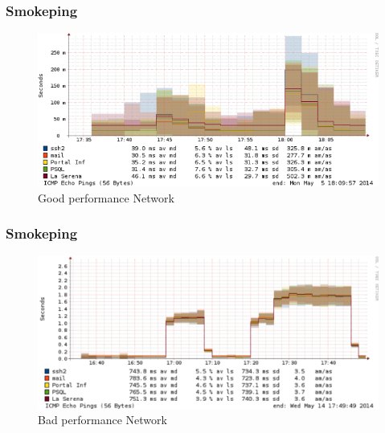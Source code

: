 \begin{frame}
	\frametitle{Smokeping}
	\begin{figure}[h!]
		\centering 
		\includegraphics[scale=.35]{img/smoke_nat_good} 
		\caption[Smokeping: Ping test to National servers with good performance]{Good performance Network} 
	\end{figure}%
\end{frame}
\begin{frame}
	\frametitle{Smokeping}
	\begin{figure}[h!]
			\centering 
			\includegraphics[scale=.35]{img/smoke_nat_bad} 
			\caption[Smokeping: Ping test to National servers with bad performance]{Bad performance Network} 
	\end{figure} 
\end{frame}



